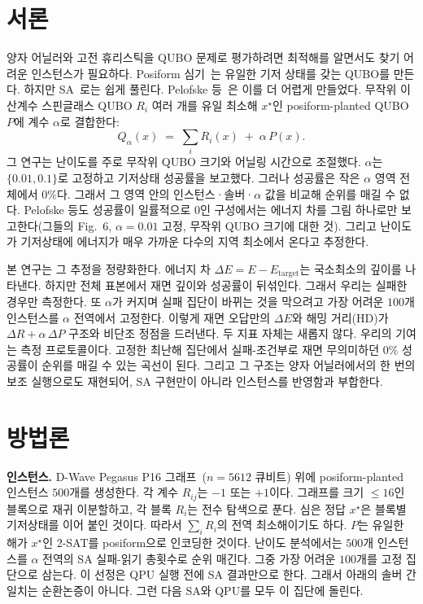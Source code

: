 \documentclass[10pt, conference]{IEEEtran}
\begin{document}
\section{서론}
양자 어닐러와 고전 휴리스틱을 QUBO 문제로 평가하려면 최적해를 알면서도 찾기
어려운 인스턴스가 필요하다. Posiform 심기~\cite{hahn2023posiform}는 유일한 기저
상태를 갖는 QUBO를 만든다. 하지만 SA~\cite{kirkpatrick1983}로는 쉽게 풀린다.
Pelofske 등~\cite{pelofske2024hardened}은 이를 더 어렵게 만들었다. 무작위 이산계수
스핀글래스 QUBO $R_i$ 여러 개를 유일 최소해 $x^\star$인 posiform-planted QUBO
$P$에 계수 $\alpha$로 결합한다:
\begin{equation}
  Q_{\alpha}(x) \;=\; \sum_{i} R_{i}(x) \;+\; \alpha\,P(x).
  \label{eq:qalpha}
\end{equation}
그 연구는 난이도를 주로 무작위 QUBO 크기와 어닐링 시간으로 조절했다. $\alpha$는
$\{0.01,0.1\}$로 고정하고 기저상태 성공률을 보고했다. 그러나 성공률은 작은
$\alpha$ 영역 전체에서 $0\%$다. 그래서 그 영역 안의 인스턴스·솔버·$\alpha$ 값을
비교해 순위를 매길 수 없다. Pelofske 등도 성공률이 일률적으로 $0$인 구성에서는
에너지 차를 그림 하나로만 보고한다(그들의 Fig.~6, $\alpha{=}0.01$ 고정, 무작위
QUBO 크기에 대한 것). 그리고 난이도가 기저상태에 에너지가 매우 가까운 다수의 지역
최소에서 온다고 추정한다.

본 연구는 그 추정을 정량화한다. 에너지 차 $\Delta E = E - E_\text{target}$는
국소최소의 깊이를 나타낸다. 하지만 전체 표본에서 재면 깊이와 성공률이 뒤섞인다.
그래서 우리는 실패한 경우만 측정한다. 또 $\alpha$가 커지며 실패 집단이 바뀌는
것을 막으려고 가장 어려운 $100$개 인스턴스를 $\alpha$ 전역에서 고정한다. 이렇게
재면 오답만의 $\Delta E$와 해밍 거리(HD)가 $\Delta R{+}\alpha\,\Delta P$ 구조와
비단조 정점을 드러낸다. 두 지표 자체는 새롭지 않다. 우리의 기여는 측정
프로토콜이다. 고정한 최난해 집단에서 실패-조건부로 재면 무의미하던 $0\%$ 성공률이
순위를 매길 수 있는 곡선이 된다. 그리고 그 구조는 양자 어닐러에서의 한 번의 보조
실행으로도 재현되어, SA 구현만이 아니라 인스턴스를 반영함과 부합한다.

\section{방법론}
\textbf{인스턴스.} D-Wave Pegasus P16 그래프~\cite{boothby2020}($n{=}5612$ 큐비트)
위에 posiform-planted 인스턴스 $500$개를 생성한다. 각 계수 $R_{ij}$는 $-1$ 또는
$+1$이다. 그래프를 크기 $\leq 16$인 블록으로 재귀 이분할하고, 각 블록 $R_i$는
전수 탐색으로 푼다. 심은 정답 $x^\star$은 블록별 기저상태를 이어 붙인 것이다.
따라서 $\sum_i R_i$의 전역 최소해이기도 하다. $P$는 유일한 해가 $x^\star$인
2-SAT를 posiform으로 인코딩한 것이다. 난이도 분석에서는 $500$개 인스턴스를
$\alpha$ 전역의 SA 실패-읽기 총횟수로 순위 매긴다. 그중 가장 어려운 $100$개를
고정 집단으로 삼는다. 이 선정은 QPU 실행 전에 SA 결과만으로 한다. 그래서 아래의
솔버 간 일치는 순환논증이 아니다. 그런 다음 SA와 QPU를 모두 이 집단에 돌린다.
\end{document}
